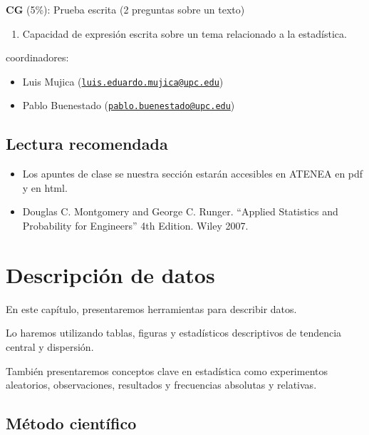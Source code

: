 \documentclass[
]{book}
\providecommand{\tightlist}{%
  \setlength{\itemsep}{0pt}\setlength{\parskip}{0pt}}
\begin{document}
\textbf{CG} (5\%): Prueba escrita (2 preguntas sobre un texto)

\begin{enumerate}
\def\labelenumi{\alph{enumi}.}
\tightlist
\item
  Capacidad de expresión escrita sobre un tema relacionado a la estadística.
\end{enumerate}

coordinadores:

\begin{itemize}
\tightlist
\item
  Luis Mujica (\href{mailto:luis.eduardo.mujica@upc.edu}{\nolinkurl{luis.eduardo.mujica@upc.edu}})
\item
  Pablo Buenestado (\href{mailto:pablo.buenestado@upc.edu}{\nolinkurl{pablo.buenestado@upc.edu}})
\end{itemize}

\hypertarget{lectura-recomendada}{%
\section{Lectura recomendada}\label{lectura-recomendada}}

\begin{itemize}
\item
  Los apuntes de clase se nuestra sección estarán accesibles en ATENEA en pdf y en html.
\item
  Douglas C. Montgomery and George C. Runger. ``Applied Statistics and Probability for Engineers'' 4th Edition. Wiley 2007.
\end{itemize}

\hypertarget{descripciuxf3n-de-datos}{%
\chapter{Descripción de datos}\label{descripciuxf3n-de-datos}}

En este capítulo, presentaremos herramientas para describir datos.

Lo haremos utilizando tablas, figuras y estadísticos descriptivos de tendencia central y dispersión.

También presentaremos conceptos clave en estadística como experimentos aleatorios, observaciones, resultados y frecuencias absolutas y relativas.

\hypertarget{muxe9todo-cientuxedfico}{%
\section{Método científico}\label{muxe9todo-cientuxedfico}}
\end{document}
